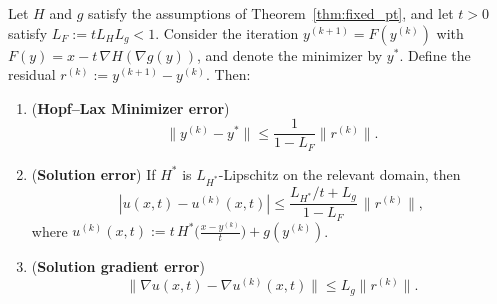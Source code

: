 \documentclass[review,hidelinks,onefignum,onetabnum]{siamart250106}
\newtheorem{example}{Example}[section]
\begin{document}





\begin{theorem}\label{thm:residual_error}
Let \(H\) and \(g\) satisfy the assumptions of Theorem~\ref{thm:fixed_pt}, and let \(t>0\) satisfy \(L_F := t L_H L_g < 1\).  
Consider the iteration \(y^{(k+1)} = F(y^{(k)})\) with \(F(y) = x - t\,\nabla H(\nabla g(y))\),
and denote the minimizer by \(y^\ast\). Define the residual \(r^{(k)} := y^{(k+1)} - y^{(k)}\).
Then:
\begin{enumerate}
    \item (\textbf{Hopf--Lax Minimizer error})
    \[
    \|y^{(k)} - y^\ast\| \le \frac{1}{1 - L_F} \|r^{(k)}\|.
    \]
    \item (\textbf{Solution error})  
    If \(H^\ast\) is \(L_{H^\ast}\)-Lipschitz on the relevant domain, then
    \[
    |u(x,t) - u^{(k)}(x,t)| \le \frac{L_{H^\ast}/t + L_g}{1 - L_F}\, \|r^{(k)}\|,
    \]
    where \(u^{(k)}(x,t) := t\, H^\ast\!\big(\frac{x - y^{(k)}}{t}\big) + g(y^{(k)})\).
    \item (\textbf{Solution gradient error})  
    \[
    \|\nabla u(x,t) - \nabla u^{(k)}(x,t)\| 
\le L_g\| r^{(k)} \|.
    \]
\end{enumerate}
\end{theorem}
\end{document}
